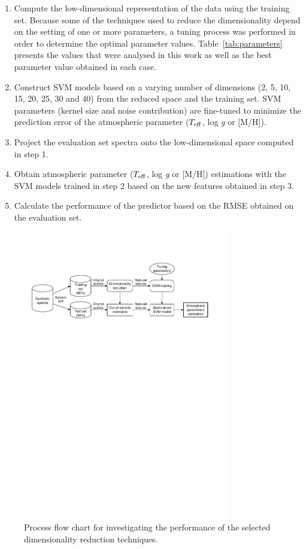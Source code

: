 \documentclass[a4paper,fleqn,usenatbib]{mnras}
\begin{document}
\begin{enumerate}
\item Compute the low-dimensional representation of the data using the
  training set. Because some of the techniques used to reduce the 
  dimensionality depend on the setting of one or more parameters, 
  a tuning process was performed in order to determine the optimal 
  parameter values. Table~\ref{tab:parameters} presents the values 
  that were analysed in this work as well as the best parameter value 
  obtained in each case.
\item Construct SVM models based on a varying number of dimensions (2,
  5, 10, 15, 20, 25, 30 and 40) from the reduced space and the
    training set. SVM parameters (kernel size and noise contribution)
    are fine-tuned to minimize the prediction error of the 
    atmospheric parameter ($T_{\rm eff}$, log \textit{g} or [M/H]).
\item Project the evaluation set spectra onto the
  low-dimensional space computed in step 1.
\item Obtain atmospheric parameter ($T_{\rm eff}$, 
  log \textit{g} or [M/H]) estimations with the SVM models trained in step
  2 based on the new features obtained in step 3.
\item Calculate the performance of the predictor based on the RMSE
  obtained on the evaluation set.
\end{enumerate}

\begin{figure}
\centering\includegraphics[width=0.8\textwidth]{flowchart.pdf}
\caption{Process flow chart for investigating the performance of the 
selected dimensionality reduction techniques.}
\label{fig:flowchart}
\end{figure}
\end{document}
